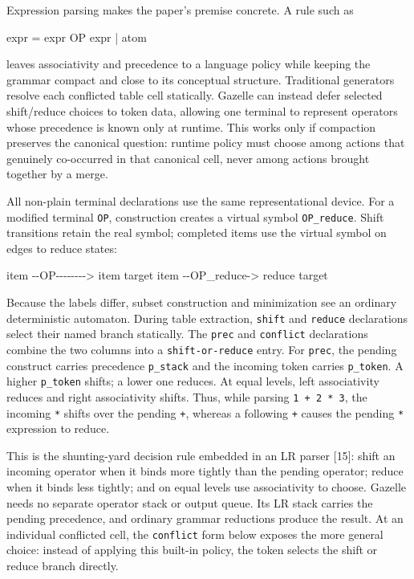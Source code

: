 \documentclass[
  10pt,
]{article}
\newenvironment{Shaded}{}{}
\newcommand{\NormalTok}[1]{#1}
\begin{document}
Expression parsing makes the paper's premise concrete. A rule such as

\begin{Shaded}
\begin{Highlighting}[]
\NormalTok{expr = expr OP expr | atom}
\end{Highlighting}
\end{Shaded}

leaves associativity and precedence to a language policy while keeping
the grammar compact and close to its conceptual structure. Traditional
generators resolve each conflicted table cell statically. Gazelle can
instead defer selected shift/reduce choices to token data, allowing one
terminal to represent operators whose precedence is known only at
runtime. This works only if compaction preserves the canonical question:
runtime policy must choose among actions that genuinely co-occurred in
that canonical cell, never among actions brought together by a merge.

All non-plain terminal declarations use the same representational
device. For a modified terminal \texttt{OP}, construction creates a
virtual symbol \texttt{OP\_reduce}. Shift transitions retain the real
symbol; completed items use the virtual symbol on edges to reduce
states:

\begin{Shaded}
\begin{Highlighting}[]
\NormalTok{item {-}{-}OP{-}{-}{-}{-}{-}{-}{-}{-}\textgreater{} item target}
\NormalTok{item {-}{-}OP\_reduce{-}\textgreater{} reduce target}
\end{Highlighting}
\end{Shaded}

Because the labels differ, subset construction and minimization see an
ordinary deterministic automaton. During table extraction,
\texttt{shift} and \texttt{reduce} declarations select their named
branch statically. The \texttt{prec} and \texttt{conflict} declarations
combine the two columns into a \texttt{shift-or-reduce} entry. For
\texttt{prec}, the pending construct carries precedence
\texttt{p\_stack} and the incoming token carries \texttt{p\_token}. A
higher \texttt{p\_token} shifts; a lower one reduces. At equal levels,
left associativity reduces and right associativity shifts. Thus, while
parsing \texttt{1\ +\ 2\ *\ 3}, the incoming \texttt{*} shifts over the
pending \texttt{+}, whereas a following \texttt{+} causes the pending
\texttt{*} expression to reduce.

This is the shunting-yard decision rule embedded in an LR parser
{[}15{]}: shift an incoming operator when it binds more tightly than the
pending operator; reduce when it binds less tightly; and on equal levels
use associativity to choose. Gazelle needs no separate operator stack or
output queue. Its LR stack carries the pending precedence, and ordinary
grammar reductions produce the result. At an individual conflicted cell,
the \texttt{conflict} form below exposes the more general choice:
instead of applying this built-in policy, the token selects the shift or
reduce branch directly.
\end{document}
